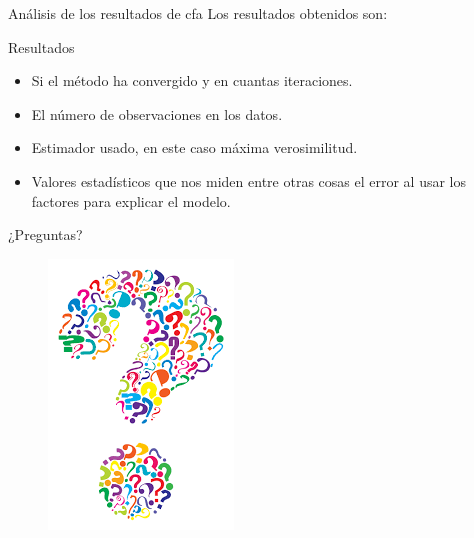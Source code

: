 \documentclass[10pt]{beamer}
\begin{document}
\begin{frame}[fragile]{Análisis de los resultados de cfa}
Los resultados obtenidos son:
\begin{alertblock}{Resultados}
	\begin{itemize}
		\item Si el método ha convergido y en cuantas iteraciones.
		\item El número de observaciones en los datos.
		\item Estimador usado, en este caso máxima verosimilitud.
		\item Valores estadísticos que nos miden entre otras cosas el error al usar los factores para explicar el modelo.
	\end{itemize}
\end{alertblock}
\end{frame}

\begin{frame}[standout]
	\LARGE{¿Preguntas?}
	\vspace{10px}
	\begin{figure}
		\includegraphics[scale=0.5]{./Imagenes/preguntas.png}
	\end{figure}
\end{frame}
\end{document}
